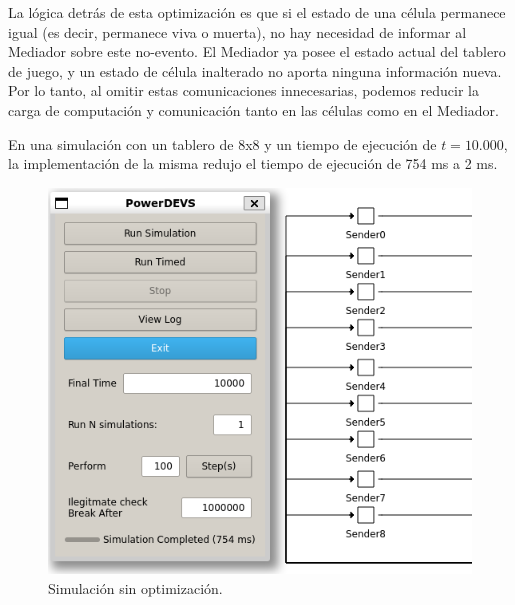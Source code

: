 \documentclass[]{article}
\begin{document}
La lógica detrás de esta optimización es que si el estado de una célula permanece igual (es decir, permanece viva o muerta), no hay necesidad de informar al Mediador sobre este no-evento. El Mediador ya posee el estado actual del tablero de juego, y un estado de célula inalterado no aporta ninguna información nueva. Por lo tanto, al omitir estas comunicaciones innecesarias, podemos reducir la carga de computación y comunicación tanto en las células como en el Mediador.

En una simulación con un tablero de 8x8 y un tiempo de ejecución de \( t = 10.000 \), la implementación de la misma redujo el tiempo de ejecución de 754 ms a 2 ms. 
\begin{figure}[ht]
  \begin{minipage}[b]{0.44\linewidth}
    \centering
    \includegraphics[width=\textwidth]{../assets/pdevs/754ms.png}
    \caption{Simulación sin optimización.}
    \label{fig:no_optimization}
  \end{minipage}
  \hspace{0.5cm}
  \begin{minipage}[b]{0.455\linewidth}
    \centering

\end{minipage}
\end{figure}
\end{document}
